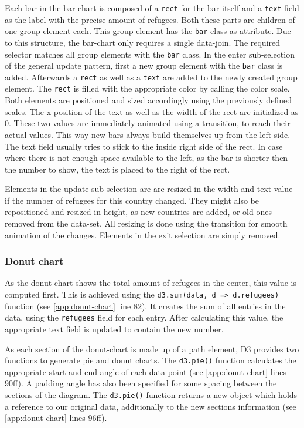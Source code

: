 Each bar in the bar chart is composed of a \texttt{rect} for the bar itself and a \texttt{text} field as the label with the precise amount of refugees. Both these parts are children of one group element each. This group element has the \texttt{bar} class as attribute. Due to this structure, the bar-chart only requires a single data-join. The required selector matches all group elements with the \texttt{bar} class. In the enter sub-selection of the general update pattern, first a new group element with the \texttt{bar} class is added. Afterwards a \texttt{rect} as well as a \texttt{text} are added to the newly created group element.  The \texttt{rect} is filled with the appropriate color by calling the color scale. Both elements are positioned and sized accordingly using the previously defined scales. The x position of the text as well as the width of the rect are initialized as 0. These two values are immediately animated using a transition, to reach their actual values. This way new bars always build themselves up from the left side. The text field usually tries to stick to the inside right side of the rect. In case where there is not enough space available to the left, as the bar is shorter then the number to show, the text is placed to the right of the rect.

Elements in the update sub-selection are are resized in the width and text value if the number of refugees for this country changed. They might also be repositioned and resized in height, as new countries are added, or old ones removed from the data-set. All resizing is done using the transition for smooth animation of the changes. Elements in the exit selection are simply removed.

\subsubsection{Donut chart}

As the donut-chart shows the total amount of refugees in the center, this value is computed first. This is achieved using the \texttt{d3.sum(data, d => d.refugees)} function (see \ref{app:donut-chart} line 82). It creates the sum of all entries in the data, using the \texttt{refugees} field for each entry. After calculating this value, the appropriate text field is updated to contain the new number.

As each section of the donut-chart is made up of a path element, D3 provides two functions to generate pie and donut charts. The \texttt{d3.pie()} function calculates the appropriate start and end angle of each data-point (see \ref{app:donut-chart} lines 90ff). A padding angle has also been specified for some spacing between the sections of the diagram. The \texttt{d3.pie()} function returns a new object which holds a reference to our original data, additionally to the new sections information (see \ref{app:donut-chart} lines 96ff). 

